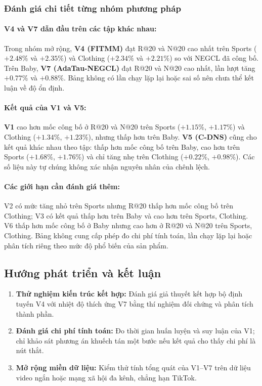 \subsubsection{Đánh giá chi tiết từng nhóm phương pháp}

\paragraph{V4 và V7 dẫn đầu trên các tập khác nhau:}
Trong nhóm mở rộng, \textbf{V4 (FITMM)} đạt R@20 và N@20 cao nhất trên Sports ($+2.48\%$ và $+2.35\%$) và Clothing ($+2.34\%$ và $+2.21\%$) so với NEGCL đã công bố. Trên Baby, \textbf{V7 (AdaTau-NEGCL)} đạt R@20 và N@20 cao nhất, lần lượt tăng $+0.77\%$ và $+0.88\%$. Bảng không có lần chạy lặp lại hoặc sai số nên chưa thể kết luận về độ ổn định.

\paragraph{Kết quả của V1 và V5:}
\textbf{V1} cao hơn mốc công bố ở R@20 và N@20 trên Sports ($+1.15\%$, $+1.17\%$) và Clothing ($+1.34\%$, $+1.23\%$), nhưng thấp hơn trên Baby. \textbf{V5 (C-DNS)} cũng cho kết quả khác nhau theo tập: thấp hơn mốc công bố trên Baby, cao hơn trên Sports ($+1.68\%$, $+1.76\%$) và chỉ tăng nhẹ trên Clothing ($+0.22\%$, $+0.98\%$). Các số liệu này tự chúng không xác nhận nguyên nhân của chênh lệch.

\paragraph{Các giới hạn cần đánh giá thêm:}
V2 có mức tăng nhỏ trên Sports nhưng R@20 thấp hơn mốc công bố trên Clothing; V3 có kết quả thấp hơn trên Baby và cao hơn trên Sports, Clothing. V6 thấp hơn mốc công bố ở Baby nhưng cao hơn ở R@20 và N@20 trên Sports, Clothing. Bảng không cung cấp phép đo chi phí tính toán, lần chạy lặp lại hoặc phân tích riêng theo mức độ phổ biến của sản phẩm.

\subsection{Hướng phát triển và kết luận}
\label{sec:future_and_conclusion}

\begin{enumerate}[leftmargin=*, label=\textbf{\arabic*.}]
  \item \textbf{Thử nghiệm kiến trúc kết hợp:} Đánh giá giả thuyết kết hợp bộ định tuyến V4 với nhiệt độ thích ứng V7 bằng thí nghiệm đối chứng và phân tích thành phần.
  \item \textbf{Đánh giá chi phí tính toán:} Đo thời gian huấn luyện và suy luận của V1; chỉ khảo sát phương án khuếch tán một bước nếu kết quả cho thấy chi phí là nút thắt.
  \item \textbf{Mở rộng miền dữ liệu:} Kiểm thử tính tổng quát của V1--V7 trên dữ liệu video ngắn hoặc mạng xã hội đa kênh, chẳng hạn TikTok.
\end{enumerate}

